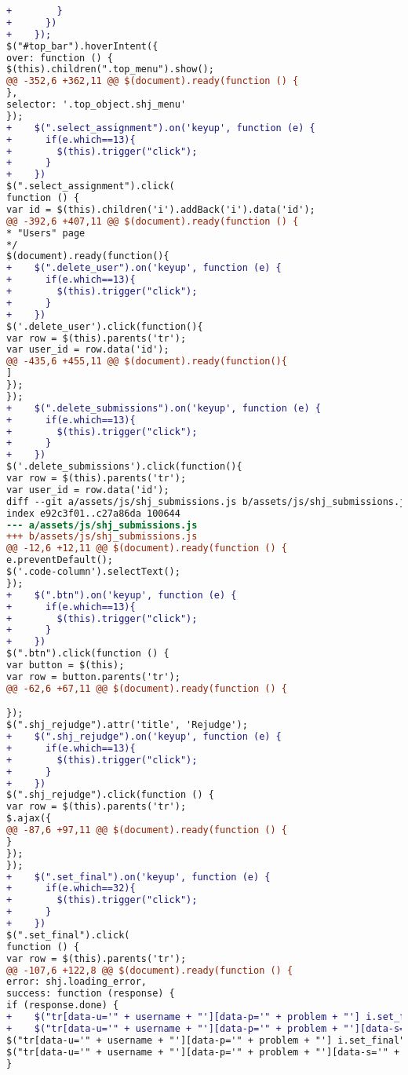 \begin{itemize}
\begin{lstlisting}[language=diff, caption=Perubahan untuk mematuhi kriteria 2.1.1, label=lst_2.1.1, basicstyle=\ttfamily, frame=single,
columns=fullflexible, keepspaces=true, breaklines=true]
+        }
+      })
+    });
$("#top_bar").hoverIntent({
over: function () {
$(this).children(".top_menu").show();
@@ -352,6 +362,11 @@ $(document).ready(function () {
},
selector: '.top_object.shj_menu'
});
+    $(".select_assignment").on('keyup', function (e) {
+      if(e.which==13){
+        $(this).trigger("click");
+      }
+    })
$(".select_assignment").click(
function () {
var id = $(this).children('i').addBack('i').data('id');
@@ -392,6 +407,11 @@ $(document).ready(function () {
* "Users" page
*/
$(document).ready(function(){
+    $(".delete_user").on('keyup', function (e) {
+      if(e.which==13){
+        $(this).trigger("click");
+      }
+    })
$('.delete_user').click(function(){
var row = $(this).parents('tr');
var user_id = row.data('id');
@@ -435,6 +455,11 @@ $(document).ready(function(){
]
});
});
+    $(".delete_submissions").on('keyup', function (e) {
+      if(e.which==13){
+        $(this).trigger("click");
+      }
+    })
$('.delete_submissions').click(function(){
var row = $(this).parents('tr');
var user_id = row.data('id');
diff --git a/assets/js/shj_submissions.js b/assets/js/shj_submissions.js
index e92c3f01..c27a86da 100644
--- a/assets/js/shj_submissions.js
+++ b/assets/js/shj_submissions.js
@@ -12,6 +12,11 @@ $(document).ready(function () {
e.preventDefault();
$('.code-column').selectText();
});
+    $(".btn").on('keyup', function (e) {
+      if(e.which==13){
+        $(this).trigger("click");
+      }
+    })
$(".btn").click(function () {
var button = $(this);
var row = button.parents('tr');
@@ -62,6 +67,11 @@ $(document).ready(function () {

});
$(".shj_rejudge").attr('title', 'Rejudge');
+    $(".shj_rejudge").on('keyup', function (e) {
+      if(e.which==13){
+        $(this).trigger("click");
+      }
+    })
$(".shj_rejudge").click(function () {
var row = $(this).parents('tr');
$.ajax({
@@ -87,6 +97,11 @@ $(document).ready(function () {
}
});
});
+    $(".set_final").on('keyup', function (e) {
+      if(e.which==32){
+        $(this).trigger("click");
+      }
+    })
$(".set_final").click(
function () {
var row = $(this).parents('tr');
@@ -107,6 +122,8 @@ $(document).ready(function () {
error: shj.loading_error,
success: function (response) {
if (response.done) {
+    $("tr[data-u='" + username + "'][data-p='" + problem + "'] i.set_final").attr("aria-checked", false);
+    $("tr[data-u='" + username + "'][data-p='" + problem + "'][data-s='" + submit_id + "'] i.set_final").attr("aria-checked", true);
$("tr[data-u='" + username + "'][data-p='" + problem + "'] i.set_final").removeClass('fa-check-circle-o color11').addClass('fa-circle-o');
$("tr[data-u='" + username + "'][data-p='" + problem + "'][data-s='" + submit_id + "'] i.set_final").removeClass('fa-circle-o').addClass('fa-check-circle-o color11');
}
\end{lstlisting}

\end{itemize}

